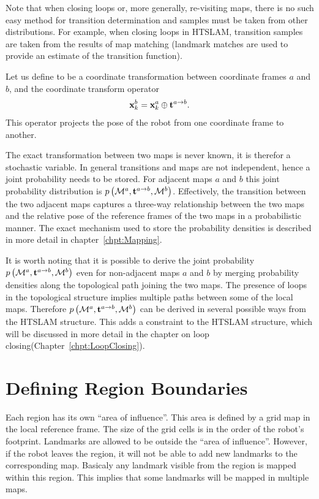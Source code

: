Note that when closing loops or, more generally, re-visiting maps,
there is no such easy method for transition determination and samples
must be taken from other distributions. For example, when closing
loops in HTSLAM, transition samples are taken from the results of map
matching (landmark matches are used to provide an estimate of
the transition function).

Let us define  to be a coordinate transformation between
coordinate frames $a$ and $b$, and the coordinate transform operator
\transit\ 
\begin{equation}
\x{k}{}{b} = \x{k}{}{a} \transit \tr{}{a}{b}.
\end{equation}
This operator projects the pose of the robot from one coordinate frame to
another.

The exact transformation between two maps is never known, it is
therefor a stochastic variable. In general transitions and maps are
not independent, hence a joint probability needs to be stored. For
adjacent maps $a$ and $b$ this joint probability distribution is
$\prob{\map{}{}{a},\tr{}{a}{b}, \map{}{}{b}}$. Effectively,
the transition between the two adjacent maps captures a three-way
relationship between the two maps and the relative pose of the
reference frames of the two maps in a probabilistic manner. The exact
mechanism used to store the probability densities is described in more
detail in chapter~\ref{chpt:Mapping}.

It is worth noting that it is possible to derive the joint
probability $\prob{\map{}{}{a},\tr{}{a}{b},\map{}{}{b}}$ even for
non-adjacent maps $a$ and $b$ by merging probability densities along
the topological path joining the two maps.  The presence of loops in
the topological structure implies multiple paths between some of the
local maps. Therefore $\prob{\map{}{}{a},\tr{}{a}{b},\map{}{}{b}}$ can
be derived in several possible ways from the HTSLAM structure. This
adds a constraint to the HTSLAM structure, which will be discussed in
more detail in the chapter on loop
closing(Chapter~\ref{chpt:LoopClosing}).




\section{Defining Region Boundaries}
\label{sec:region}

Each region has its own ``area of influence''. This area is defined by
a grid map in the local reference frame. The size of the grid cells is
in the order of the robot's footprint. Landmarks are allowed to be
outside the ``area of influence''. However, if the robot leaves the
region, it will not be able to add new landmarks to the corresponding
map. Basicaly any landmark visible from the region is mapped within
this region. This implies that some landmarks will be mapped in
multiple maps.

